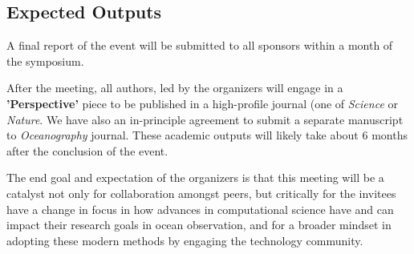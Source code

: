  
\subsection{Expected Outputs}

A final report of the event will be submitted to all sponsors within a
month of the symposium.

After the meeting, all authors, led by the organizers will engage in a
\textbf{'Perspective'} piece to be published in a high-profile journal
(one of \emph{Science} or \emph{Nature}. We have also an in-principle
agreement to submit a separate manuscript to \emph{Oceanography}
journal. These academic outputs will likely take about 6 months after
the conclusion of the event.

The end goal and expectation of the organizers is that this meeting
will be a catalyst not only for collaboration amongst peers, but
critically for the invitees have a change in focus in how advances in
computational science have and can impact their research goals in
ocean observation, and for a broader mindset in adopting these modern
methods by engaging the technology community.